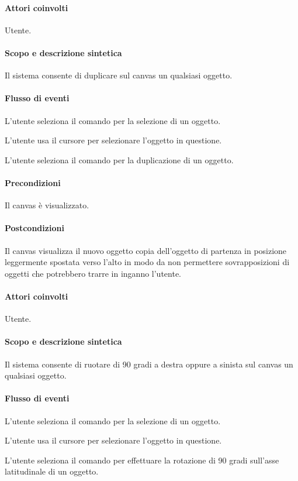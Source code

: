 \paragraph{Attori coinvolti} Utente.
\paragraph{Scopo e descrizione sintetica} Il sistema consente di duplicare sul canvas un qualsiasi oggetto.
\paragraph{Flusso di eventi}
\begin{elenconumerato}[\textbf{}]{\subsubsecindent}
\item  L'utente seleziona il comando per la selezione di un oggetto.
\item  L'utente usa il cursore per selezionare l'oggetto in questione.
\item  L'utente seleziona il comando per la duplicazione di un oggetto.
\end{elenconumerato}
\paragraph{Precondizioni} Il canvas \`e visualizzato. 
\paragraph{Postcondizioni} Il canvas visualizza il nuovo oggetto copia dell'oggetto di partenza in posizione leggermente spostata verso l'alto in modo da non permettere sovrapposizioni di oggetti che potrebbero trarre in inganno l'utente.

\paragraph{Attori coinvolti} Utente.
\paragraph{Scopo e descrizione sintetica} Il sistema consente di ruotare di 90 gradi a destra oppure a sinista sul canvas un qualsiasi oggetto.
\paragraph{Flusso di eventi}
\begin{elenconumerato}[\textbf{}]{\subsubsecindent}
\item  L'utente seleziona il comando per la selezione di un oggetto.
\item  L'utente usa il cursore per selezionare l'oggetto in questione.
\item  L'utente seleziona il comando per effettuare la rotazione di 90 gradi sull'asse latitudinale di un oggetto.
\end{elenconumerato}
